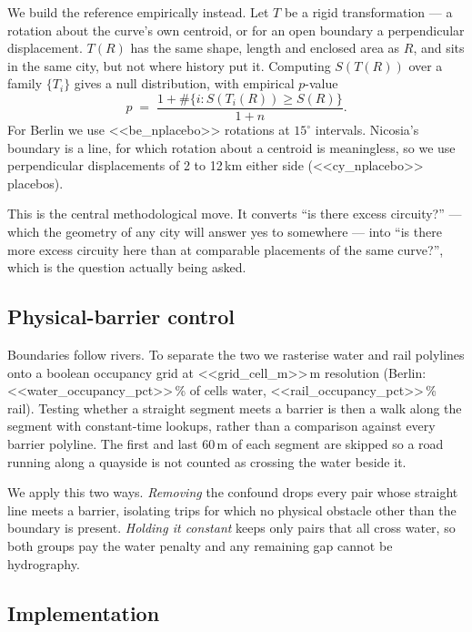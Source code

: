 \documentclass[11pt,a4paper]{article}
\begin{document}
We build the reference empirically instead. Let $T$ be a rigid transformation
--- a rotation about the curve's own centroid, or for an open boundary a
perpendicular displacement. $T(R)$ has the same shape, length and enclosed area
as $R$, and sits in the same city, but not where history put it. Computing
$S(T(R))$ over a family $\{T_i\}$ gives a null distribution, with empirical
$p$-value
\[
  p \;=\; \frac{1 + \#\{ i : S(T_i(R)) \ge S(R) \}}{1 + n} .
\]
For Berlin we use <<be_nplacebo>> rotations at $15^{\circ}$ intervals. Nicosia's
boundary is a line, for which rotation about a centroid is meaningless, so we
use perpendicular displacements of 2 to 12\,km either side
(<<cy_nplacebo>> placebos).

This is the central methodological move. It converts ``is there excess
circuity?'' --- which the geometry of any city will answer yes to somewhere ---
into ``is there more excess circuity here than at comparable placements of the
same curve?'', which is the question actually being asked.

\subsection{Physical-barrier control}\label{sec:barriers}

Boundaries follow rivers. To separate the two we rasterise water and rail
polylines onto a boolean occupancy grid at <<grid_cell_m>>\,m resolution
(Berlin: <<water_occupancy_pct>>\,\% of cells water, <<rail_occupancy_pct>>\,\%
rail). Testing whether a straight segment meets a barrier is then a walk along
the segment with constant-time lookups, rather than a comparison against every
barrier polyline. The first and last 60\,m of each segment are skipped so a road
running along a quayside is not counted as crossing the water beside it.

We apply this two ways. \emph{Removing} the confound drops every pair whose
straight line meets a barrier, isolating trips for which no physical obstacle
other than the boundary is present. \emph{Holding it constant} keeps only pairs
that all cross water, so both groups pay the water penalty and any remaining gap
cannot be hydrography.

\subsection{Implementation}
\end{document}
